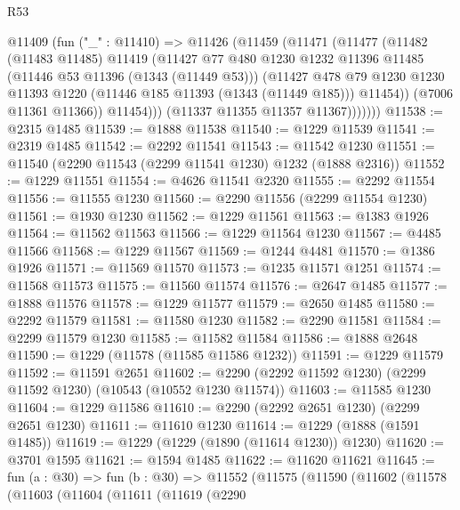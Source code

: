 \begin{lexlean}{R53}
\begin{coremodule}
            @11409
              (fun ("_" : @11410) =>
              @11426
                (@11459
                  (@11471
                    (@11477
                      (@11482
                        (@11483 @11485)
                        @11419
                        (@11427
                          @77
                          @480
                          @1230
                          @1232
                          @11396
                          @11485
                          (@11446 @53 @11396 (@1343 (@11449 @53)))
                          (@11427
                            @478
                            @79
                            @1230
                            @1230
                            @11393
                            @1220
                            (@11446 @185 @11393 (@1343 (@11449 @185)))
                            @11454))
                        (@7006 @11361 @11366))
                      @11454)))
                (@11337 @11355 @11357 @11367)))))))
@11538 := @2315 @1485
@11539 := @1888 @11538
@11540 := @1229 @11539
@11541 := @2319 @1485
@11542 := @2292 @11541
@11543 := @11542 @1230
@11551 := @11540 (@2290 @11543 (@2299 @11541 @1230) @1232 (@1888 @2316))
@11552 := @1229 @11551
@11554 := @4626 @11541 @2320
@11555 := @2292 @11554
@11556 := @11555 @1230
@11560 := @2290 @11556 (@2299 @11554 @1230)
@11561 := @1930 @1230
@11562 := @1229 @11561
@11563 := @1383 @1926
@11564 := @11562 @11563
@11566 := @1229 @11564 @1230
@11567 := @4485 @11566
@11568 := @1229 @11567
@11569 := @1244 @4481
@11570 := @1386 @1926
@11571 := @11569 @11570
@11573 := @1235 @11571 @1251
@11574 := @11568 @11573
@11575 := @11560 @11574
@11576 := @2647 @1485
@11577 := @1888 @11576
@11578 := @1229 @11577
@11579 := @2650 @1485
@11580 := @2292 @11579
@11581 := @11580 @1230
@11582 := @2290 @11581
@11584 := @2299 @11579 @1230
@11585 := @11582 @11584
@11586 := @1888 @2648
@11590 := @1229 (@11578 (@11585 @11586 @1232))
@11591 := @1229 @11579
@11592 := @11591 @2651
@11602 := @2290 (@2292 @11592 @1230) (@2299 @11592 @1230) (@10543 (@10552 @1230 @11574))
@11603 := @11585 @1230
@11604 := @1229 @11586
@11610 := @2290 (@2292 @2651 @1230) (@2299 @2651 @1230)
@11611 := @11610 @1230
@11614 := @1229 (@1888 (@1591 @1485))
@11619 := @1229 (@1229 (@1890 (@11614 @1230)) @1230)
@11620 := @3701 @1595
@11621 := @1594 @1485
@11622 := @11620 @11621
@11645 := fun (a : @30) =>
  fun (b : @30) =>
  @11552
    (@11575
      (@11590
        (@11602
          (@11578
            (@11603
              (@11604
                (@11611
                  (@11619
                    (@2290

\end{coremodule}
\end{lexlean}
